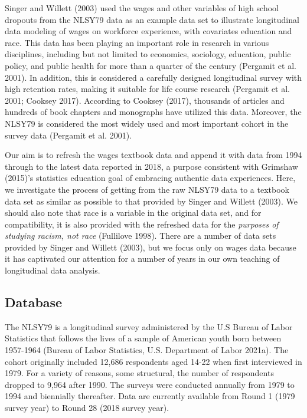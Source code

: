 \documentclass{article}
\begin{document}
Singer and Willett (2003) used the wages and other variables of high school dropouts from the NLSY79 data as an example data set to illustrate longitudinal data modeling of wages on workforce experience, with covariates education and race. This data has been playing an important role in research in various disciplines, including but not limited to economics, sociology, education, public policy, and public health for more than a quarter of the century (Pergamit et al. 2001). In addition, this is considered a carefully designed longitudinal survey with high retention rates, making it suitable for life course research (Pergamit et al. 2001; Cooksey 2017). According to Cooksey (2017), thousands of articles and hundreds of book chapters and monographs have utilized this data. Moreover, the NLSY79 is considered the most widely used and most important cohort in the survey data (Pergamit et al. 2001).

Our aim is to refresh the wages textbook data and append it with data from 1994 through to the latest data reported in 2018, a purpose consistent with Grimshaw (2015)'s statistics education goal of embracing authentic data experiences. Here, we investigate the process of getting from the raw NLSY79 data to a textbook data set as similar as possible to that provided by Singer and Willett (2003). We should also note that race is a variable in the original data set, and for compatibility, it is also provided with the refreshed data for the \emph{purposes of studying racism, not race} (Fullilove 1998). There are a number of data sets provided by Singer and Willett (2003), but we focus only on wages data because it has captivated our attention for a number of years in our own teaching of longitudinal data analysis.

\hypertarget{database-1}{%
\subsection{Database}\label{database-1}}

The NLSY79 is a longitudinal survey administered by the U.S Bureau of Labor Statistics that follows the lives of a sample of American youth born between 1957-1964 (Bureau of Labor Statistics, U.S. Department of Labor 2021a). The cohort originally included 12,686 respondents aged 14-22 when first interviewed in 1979. For a variety of reasons, some structural, the number of respondents dropped to 9,964 after 1990. The surveys were conducted annually from 1979 to 1994 and biennially thereafter. Data are currently available from Round 1 (1979 survey year) to Round 28 (2018 survey year).
\end{document}
